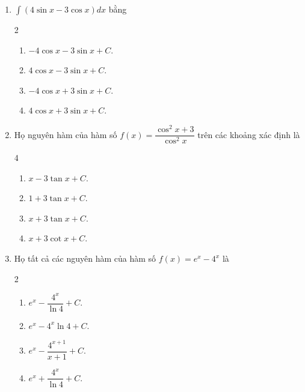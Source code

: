 \documentclass[12pt]{article}
\begin{document}
\begin{enumerate}[label=\textbf{Câu \arabic*.}]
\begin{multicols}{4}
\begin{enumerate}[label=\textbf{\Alph*.}]
				\item $\dfrac{7}{3} x^{\frac{7}{3}} + C$.
				\item $\dfrac{3}{7} x^{\frac{7}{3}} + C$.
				\item $\dfrac{3}{4} x^{\frac{4}{3}} + C$.
				\item $\dfrac{4}{3} x^{\frac{4}{3}} + C$.
			\end{enumerate}
		\end{multicols}
		
		\item $\displaystyle \int (4\sin x - 3\cos x) dx$ bằng
		\begin{multicols}{2}
			\begin{enumerate}[label=\textbf{\Alph*.}]
				\item $-4\cos x - 3\sin x + C$.
				\item $4\cos x - 3\sin x + C$.
				\item $-4\cos x + 3\sin x + C$.
				\item $4\cos x + 3\sin x + C$.
			\end{enumerate}
		\end{multicols}
		
		\item Họ nguyên hàm của hàm số $f(x) = \dfrac{\cos^2 x + 3}{\cos^2 x}$ trên các khoảng xác định là
		\begin{multicols}{4}
			\begin{enumerate}[label=\textbf{\Alph*.}]
				
				\item $x - 3\tan x + C$.
				\item $1 + 3\tan x + C$.
				\item $x + 3\tan x + C$.
				\item $x + 3\cot x + C$.
			\end{enumerate}
		\end{multicols}
		
		\item Họ tất cả các nguyên hàm của hàm số $f(x) = e^x - 4^x$ là
		\begin{multicols}{2}
			\begin{enumerate}[label=\textbf{\Alph*.}]
				\item $e^x - \dfrac{4^x}{\ln 4} + C$.
				\item $e^x - 4^x \ln 4 + C$.
				\item $e^x - \dfrac{4^{x+1}}{x+1} + C$.
				\item $e^x + \dfrac{4^x}{\ln 4} + C$.
			\end{enumerate}
		\end{multicols}
		

\end{enumerate}
\end{document}

